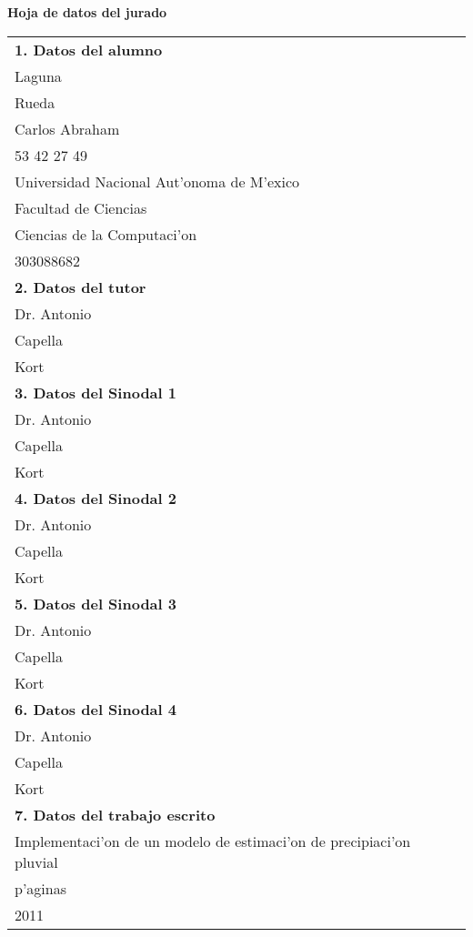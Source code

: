  \textbf{Hoja de datos del jurado}

\begin{center}
 


\begin{tabular}{|l|}

  \hline 
  \textbf{ 1. Datos del alumno}\\ Laguna \\Rueda\\Carlos Abraham\\53 42 27 49\\
  Universidad Nacional Aut'onoma de M'exico\\Facultad de Ciencias\\Ciencias de la Computaci'on\\
  303088682  \tabularnewline
  \hline
  \textbf{2. Datos del tutor}\\ Dr. Antonio\\Capella\\Kort\tabularnewline
  \hline    
  \textbf{3. Datos del Sinodal 1}\\ Dr. Antonio\\Capella\\Kort\tabularnewline
  \hline 

  \textbf{4. Datos del Sinodal 2}\\ Dr. Antonio\\Capella\\Kort\tabularnewline
  \hline 
  \textbf{5. Datos del Sinodal 3}\\ Dr. Antonio\\Capella\\Kort\tabularnewline
  \hline 
  \textbf{6. Datos del Sinodal 4}\\ Dr. Antonio\\Capella\\Kort\tabularnewline
  \hline
  \textbf{7. Datos del trabajo escrito}\\
  Implementaci'on de un modelo de estimaci'on de precipiaci'on pluvial \\
   \pageref{LastPage} p'aginas\\2011\tabularnewline
  \hline
\end{tabular}
\end{center}